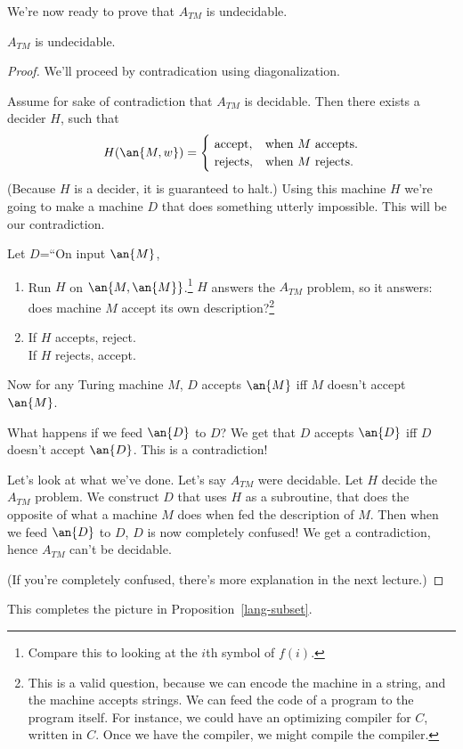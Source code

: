 We're now ready to prove that $A_{TM}$ is undecidable.
\begin{thm}
$A_{TM}$ is undecidable.
\end{thm}
\begin{proof}
We'll proceed by contradication using diagonalization.

Assume for sake of contradiction that $A_{TM}$ is decidable. Then there exists a decider $H$, such that 
\[
H(\an{M,w})=\begin{cases}
\text{ accept}, &\text{when $M$ accepts.}\\
\text{ rejects}, &\text{when $M$ rejects.}\\
\end{cases}
\]
(Because $H$ is a decider, it is guaranteed to halt.) %
Using this machine $H$ we're going to make a machine $D$ that does something utterly impossible. This will be our contradiction.

Let $D$=``On input $\an{M}$,
\begin{enumerate}
\item
Run $H$ on $\an{M,\an{M}}$.\footnote{Compare this to looking at the $i$th symbol of $f(i)$.} $H$ answers the $A_{TM}$ problem, so it answers: does machine $M$ accept its own description?\footnote{This is a valid question, because we can encode the machine in a string, and the machine accepts strings. We can feed the code of a program to the program itself. For instance, we could have an optimizing compiler for $C$, written in $C$. %
Once we have the compiler, we might compile the compiler.} %
\item If $H$ accepts, reject.\\
If $H$ rejects, accept.
\end{enumerate}
Now for any Turing machine $M$, $D$ accepts $\an{M}$ iff $M$ doesn't accept $\an{M}$. 

What happens if we feed $\an{D}$ to $D$? We get that $D$ accepts $\an{D}$ iff $D$ doesn't accept $\an{D}$. This is a contradiction!

Let's look at what we've done. Let's say $A_{TM}$ were decidable. Let $H$ decide the $A_{TM}$ problem. We construct $D$ that uses $H$ as a subroutine, that does the opposite of what a machine $M$ does when fed the description of $M$. Then when we feed $\an{D}$ to $D$, $D$ is now completely confused! We get a contradiction, hence $A_{TM}$ can't be decidable.

(If you're completely confused, there's more explanation in the next lecture.)
\end{proof}
This completes the picture in Proposition~\ref{lang-subset}.
